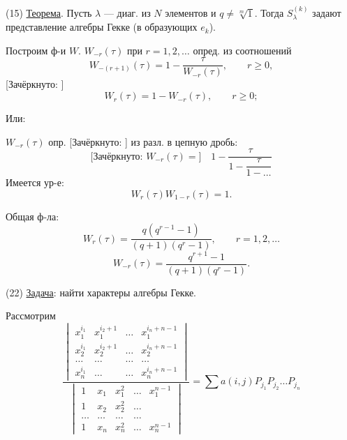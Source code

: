 (15) \underline{Теорема}. Пусть $\lambda$ — диаг. из $N$ элементов и
$q\ne\sqrt[m]{1}$. Тогда $S_{\lambda}^{(k)}$ задают представление алгебры Гекке
(в образующих $e_k$).

Построим ф-и $W$.
$W_{-r}(\tau)$ при $r=1,2,\ldots$ опред. из соотношений
\begin{equation}
 W_{-(r+1)}(\tau)=1-\frac{\tau}{W_{-r}(\tau)},\qquad r\geq0,
 \tag{16}
\end{equation}
[Зачёркнуто: ]
\begin{equation}
 W_r(\tau)=1-W_{-r}(\tau),\qquad r\geq0;
 \tag{17}
\end{equation}

Или:

$W_{-r}(\tau)$ опр.
[Зачёркнуто: ]
из разл. в цепную дробь:
\begin{equation}
 \text{[Зачёркнуто: }W_{-r}(\tau)=\text{]}\quad
 1-\frac{\tau}{1-\dfrac{\tau}{1-\ldots}}
 \tag{18}
\end{equation}
Имеется ур-е:
\begin{equation}
 W_r(\tau)W_{1-r}(\tau)=1.
 \tag{19}
\end{equation}

Общая ф-ла:
\begin{equation}
 W_r(\tau)=\frac{q(q^{r-1}-1)}{(q+1)(q^r-1)},\qquad r=1,2,\ldots
 \tag{20}
\end{equation}
\begin{equation}
 W_{-r}(\tau)=\frac{q^{r+1}-1}{(q+1)(q^r-1)}.
 \tag{21}
\end{equation}

(22) \underline{Задача}: найти характеры алгебры Гекке.

Рассмотрим
\begin{equation}
 \frac{
 \begin{vmatrix}
 x_1^{i_1}&x_1^{i_2+1}&\ldots&x_1^{i_n+n-1}\\
 x_2^{i_1}&x_2^{i_2+1}&\ldots&x_2^{i_n+n-1}\\
 \ldots&\ldots&\ldots&\ldots\\
 x_n^{i_1}&\ldots&\ldots&x_n^{i_n+n-1}
 \end{vmatrix}
 }{
 \begin{vmatrix}
 1&x_1&x_1^2&\ldots&x_1^{n-1}\\
 1&x_2&x_2^2&\ldots&\\
 \ldots&\ldots&\ldots&\ldots&\\
 1&x_n&x_n^2&\ldots&x_n^{n-1}
 \end{vmatrix}
 }
 =\sum a(i,j)P_{j_1}P_{j_2}\ldots P_{j_n}
 \tag{23}
\end{equation}


